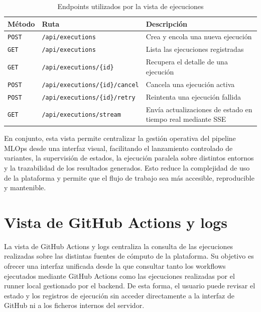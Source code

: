 \begin{table}[H]
\centering
\renewcommand{\arraystretch}{1.3}
\begin{tabular}{|l|l|p{6.5cm}|}
\hline
\textbf{Método} & \textbf{Ruta} & \textbf{Descripción} \\ \hline
\texttt{POST} & \texttt{/api/executions} & Crea y encola una nueva ejecución \\ \hline
\texttt{GET} & \texttt{/api/executions} & Lista las ejecuciones registradas \\ \hline
\texttt{GET} & \texttt{/api/executions/\{id\}} & Recupera el detalle de una ejecución \\ \hline
\texttt{POST} & \texttt{/api/executions/\{id\}/cancel} & Cancela una ejecución activa \\ \hline
\texttt{POST} & \texttt{/api/executions/\{id\}/retry} & Reintenta una ejecución fallida \\ \hline
\texttt{GET} & \texttt{/api/executions/stream} & Envía actualizaciones de estado en tiempo real mediante SSE \\ \hline
\end{tabular}
\caption{Endpoints utilizados por la vista de ejecuciones}
\label{tab:api-vista-ejecuciones}
\end{table}

En conjunto, esta vista permite centralizar la gestión operativa del pipeline MLOps desde una interfaz visual, facilitando el lanzamiento controlado de variantes, la supervisión de estados, la ejecución paralela sobre distintos entornos y la trazabilidad de los resultados generados. Esto reduce la complejidad de uso de la plataforma y permite que el flujo de trabajo sea más accesible, reproducible y mantenible.




\section{Vista de GitHub Actions y logs}


La vista de GitHub Actions y logs centraliza la consulta de las ejecuciones realizadas sobre las distintas fuentes de cómputo de la plataforma. Su objetivo es ofrecer una interfaz unificada desde la que consultar tanto los workflows ejecutados mediante GitHub Actions como las ejecuciones realizadas por el runner local gestionado por el backend. De esta forma, el usuario puede revisar el estado y los registros de ejecución sin acceder directamente a la interfaz de GitHub ni a los ficheros internos del servidor.

